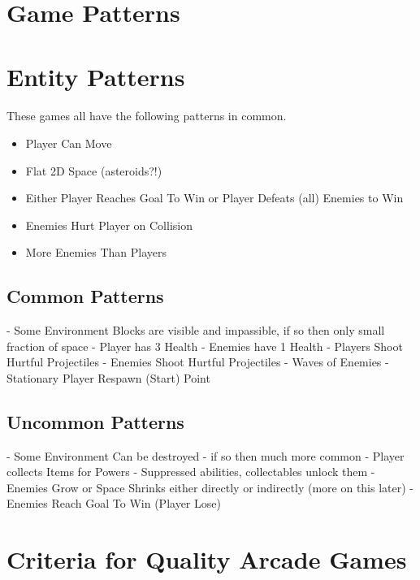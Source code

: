 \documentclass{article}
\begin{document}
\section{Game Patterns}

\section{Entity Patterns}

\paragraph{} These games all have the following patterns in common.

\begin{itemize}  
\item Player Can Move
\item Flat 2D Space (asteroids?!)
\item Either Player Reaches Goal To Win or Player Defeats (all) Enemies to Win
\item Enemies Hurt Player on Collision
\item More Enemies Than Players
\end{itemize}


\subsection{Common Patterns}

 - Some Environment Blocks are visible and impassible, if so then only small fraction of space
 - Player has 3 Health
 - Enemies have 1 Health
 - Players Shoot Hurtful Projectiles
 - Enemies Shoot Hurtful Projectiles
 - Waves of Enemies
 - Stationary Player Respawn (Start) Point


\subsection{Uncommon Patterns}

 - Some Environment Can be destroyed
   - if so then much more common
 - Player collects Items for Powers
   - Suppressed abilities, collectables unlock them
 - Enemies Grow or Space Shrinks either directly or indirectly (more on this later)
 - Enemies Reach Goal To Win (Player Lose)

\section{Criteria for Quality Arcade Games}
\end{document}
